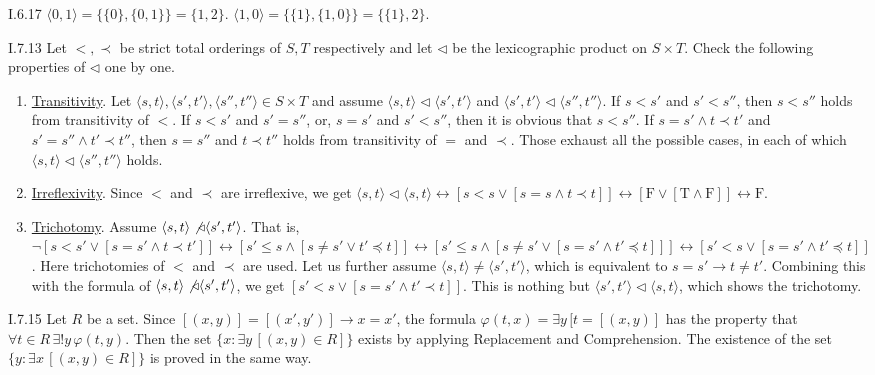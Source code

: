 \documentclass[12pt]{article}
\begin{document}
\begin{customthm}{I.6.17}
  $\langle 0,1\rangle = \{\{0\}, \{0,1\}\} = \{1,2\}$. $\langle 1,0\rangle = \{\{1\}, \{1,0\}\} = \{\{1\}, 2\}$.
\end{customthm}

\begin{customthm}{I.7.13}
  Let $<,\prec$ be strict total orderings of $S,T$ respectively and let $\triangleleft$ be the lexicographic product on $S\times T$. Check the following properties of $\triangleleft$ one by one.
  \begin{enumerate}
    \item\underline{Transitivity}. Let $\langle s,t\rangle, \langle s',t'\rangle, \langle s'',t''\rangle \in S\times T$ and assume $\langle s,t\rangle\triangleleft\langle s',t'\rangle$ and $\langle s',t'\rangle\triangleleft\langle s'',t''\rangle$. If $s<s'$ and $s'<s''$, then $s<s''$ holds from transitivity of $<$. If $s<s'$ and $s'=s''$, or, $s=s'$ and $s'<s''$, then it is obvious that $s<s''$. If $s=s'\wedge t\prec t'$ and $s'=s''\wedge t'\prec t''$, then $s=s''$ and $t\prec t''$ holds from transitivity of $=$ and $\prec$. Those exhaust all the possible cases, in each of which $\langle s,t\rangle\triangleleft\langle s'',t''\rangle$ holds.
    \item\underline{Irreflexivity}. Since $<$ and $\prec$ are irreflexive, we get $\langle s,t\rangle\triangleleft\langle s,t\rangle \leftrightarrow [s<s\vee[s=s\wedge t\prec t]] \leftrightarrow [\mathrm{F} \vee[\mathrm{T}\wedge \mathrm{F}]] \leftrightarrow \mathrm{F}$.
    \item\underline{Trichotomy}. Assume $\langle s,t\rangle\not\triangleleft\langle s',t'\rangle$. That is, $\neg[s<s'\vee[s=s'\wedge t\prec t']] \leftrightarrow [s'\leq s\wedge[s\neq s'\vee t'\preccurlyeq t]] \leftrightarrow [s'\leq s\wedge[s\neq s'\vee [s=s'\wedge t'\preccurlyeq t]]] \leftrightarrow [s'<s\vee[s=s'\wedge t'\preccurlyeq t]]$. Here trichotomies of $<$ and $\prec$ are used. Let us further assume $\langle s,t\rangle\neq\langle s',t'\rangle$, which is equivalent to $s=s'\rightarrow t\neq t'$. Combining this with the formula of $\langle s,t\rangle\not\triangleleft\langle s',t'\rangle$, we get $[s'<s\vee[s=s'\wedge t'\prec t]]$. This is nothing but $\langle s',t'\rangle\triangleleft\langle s,t\rangle$, which shows the trichotomy.
  \end{enumerate}
\end{customthm}

\begin{customthm}{I.7.15}
  Let $R$ be a set. Since  $[(x,y)]=[(x',y')]\rightarrow x=x'$, the formula $\varphi(t,x)=\exists y\,[t=[(x, y)]$ has the property that $\forall t\in R\,\exists!y\,\varphi(t,y)$. Then the set $\{x:\exists y\,[(x, y)\in R]\}$ exists by applying Replacement and Comprehension. The existence of the set $\{y:\exists x\,[(x, y)\in R]\}$ is proved in the same way.
\end{customthm}
\end{document}
